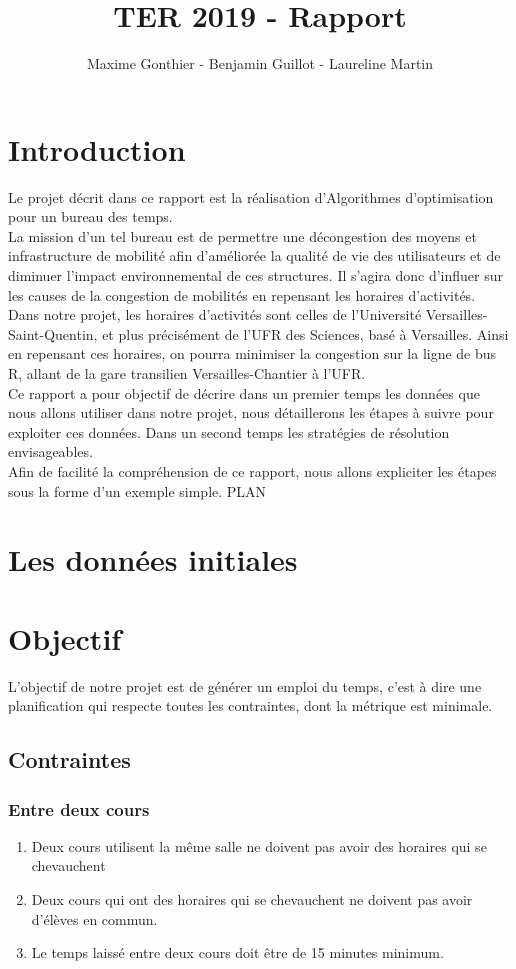 \documentclass[a4paper,11pt]{article}
\title{TER 2019 - Rapport}
\author{Maxime Gonthier - Benjamin Guillot - Laureline Martin}
\begin{document}
\clearpage
\maketitle

\newpage
\tableofcontents

\newpage
\section{Introduction}
	Le projet décrit dans ce rapport est la réalisation d'Algorithmes d'optimisation pour un bureau des temps.\\
	La mission d'un tel bureau est de permettre une décongestion des moyens et infrastructure de mobilité afin d'améliorée la qualité de vie des utilisateurs	 et de diminuer l'impact environnemental de ces structures. Il s'agira donc d'influer sur les causes de la congestion de mobilités en repensant les horaires d'activités.\\
	Dans notre projet, les horaires d'activités sont celles de l'Université Versailles-Saint-Quentin, et plus précisément de l'UFR des Sciences, basé à Versailles. Ainsi en repensant ces horaires, on pourra minimiser la congestion sur la ligne de bus R, allant de la gare transilien Versailles-Chantier à l'UFR.\\
	Ce rapport a pour objectif de décrire dans un premier temps les données que nous allons utiliser dans notre projet, nous détaillerons les étapes à suivre pour exploiter ces données. Dans un second temps les stratégies de résolution envisageables.\\
	Afin de facilité la compréhension de ce rapport, nous allons expliciter les étapes sous la forme d'un exemple simple.
	PLAN
	
\section{Les données initiales}

\section{Objectif}
	L'objectif de notre projet est de générer un emploi du temps, c'est à dire une planification qui respecte toutes les contraintes, dont la métrique est minimale.
	\subsection{Contraintes}
		\subsubsection{Entre deux cours}
				\begin{enumerate}
					\item Deux cours utilisent la même salle ne doivent pas avoir des horaires qui se chevauchent
					\item Deux cours qui ont des horaires qui se chevauchent ne doivent pas avoir d'élèves en commun.
					\item Le temps laissé entre deux cours doit être de 15 minutes minimum.
				\end{enumerate}
	
\end{document}
